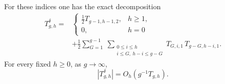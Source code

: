 \begin{lmm}\label{lmm:s08:one-node}
For these indices one has the exact decomposition
\begin{equation}\label{eq:s08:one-node}
 \begin{aligned}
 T_{g,h}^{\delta}
 ={}&
 \begin{cases}
  \tfrac12 T_{g-1,h-1,2},&h\geq1,\\
  0,&h=0
 \end{cases}\\
 &+\frac12\sum_{G=1}^{g-1}
   \ \sum_{\substack{0\leq i\leq h\\ i\leq G,\ h-i\leq g-G}}
                    T_{G,i,1}\,T_{g-G,h-i,1}.
 \end{aligned}
\end{equation}
For every fixed $h\geq0$, as $g\to\infty$,
\begin{equation}\label{eq:s08:node-bound}
 |T_{g,h}^{\delta}|=O_h(g^{-1}T_{g,h}).
\end{equation}
\end{lmm}
